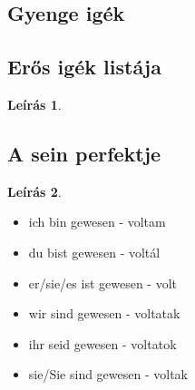 \documentclass{article}
\theoremstyle{definition}
\newtheorem*{desc}{Leírás}
\begin{document}
\subsection{Gyenge igék}

\subsection{Erős igék listája}

\begin{desc}

\end{desc}

\subsection{A sein perfektje}

\begin{desc}
\begin{itemize}
\item ich bin gewesen - voltam
\item du bist gewesen - voltál
\item er/sie/es ist gewesen - volt
\item wir sind gewesen - voltatak
\item ihr seid gewesen - voltatok
\item sie/Sie sind gewesen - voltak
\end{itemize}
\end{desc}
\end{document}
